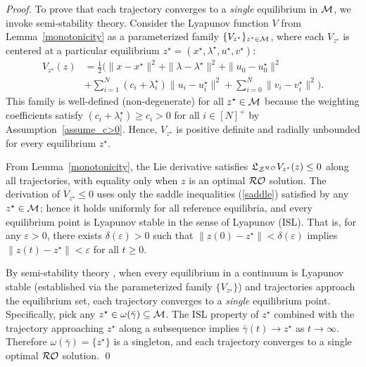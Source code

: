 \documentclass[journal,twoside,web]{ieeecolor}
\newcommand{\rev}[1]{#1}
\begin{document}
\begin{proof}
\rev{To prove that each trajectory converges to a \textit{single} equilibrium in ${\cal M}$, we invoke semi-stability theory. Consider the Lyapunov function $V$ from Lemma~\ref{monotonicity} as a parameterized family $\{V_{z^\star}\}_{z^\star \in {\cal M}}$, where each $V_{z^\star}$ is centered at a particular equilibrium $z^\star = (x^\star, \lambda^\star, u^\star, v^\star)$:
\begin{align*}
V_{z^\star}(z) &= \frac{1}{2}\big( \|x-x^\star\|^2 + \|\lambda-\lambda^\star\|^2 + \|u_0-u_0^\star\|^2 \nonumber\\&+ \sum_{i=1}^N(c_i+\lambda_i^\star) \|u_i-u_i^\star\|^2+ \sum_{i=0}^N\|v_i-v_i^\star\|^2 \big).
\end{align*}
This family is well-defined (non-degenerate) for all $z^\star \in {\cal M}$ because the weighting coefficients satisfy $(c_i + \lambda_i^\star) \geq c_i > 0$ for all $i \in [N]^+$ by Assumption~\ref{assume_c>0}. Hence, $V_{z^\star}$ is positive definite and radially unbounded for every equilibrium $z^\star$.}

\rev{From Lemma~\ref{monotonicity}, the Lie derivative satisfies $\mathfrak{L}_{{\cal Z}^{\cal RO}} V_{z^\star}(z) \leq 0$ along all trajectories, with equality only when $z$ is an optimal ${\cal RO}$ solution. The derivation of $\dot V_{z^\star} \leq 0$ uses only the saddle inequalities (\ref{saddle}) satisfied by any $z^\star \in {\cal M}$; hence it holds uniformly for all reference equilibria, and every equilibrium point is Lyapunov stable in the sense of Lyapunov (ISL). That is, for any $\varepsilon > 0$, there exists $\delta(\varepsilon) > 0$ such that $\|z(0) - z^\star\| < \delta(\varepsilon)$ implies $\|z(t) - z^\star\| < \varepsilon$ for all $t \geq 0$.}

\rev{By semi-stability theory \cite[Theorem~3.1]{haddad2009semistability}, when every equilibrium in a continuum is Lyapunov stable (established via the parameterized family $\{V_{z^\star}\}$) and trajectories approach the equilibrium set, each trajectory converges to a \textit{single} equilibrium point. Specifically, pick any $z^\star \in \omega(\bar{\gamma}) \subseteq {\cal M}$. The ISL property of $z^\star$ combined with the trajectory approaching $z^\star$ along a subsequence implies $\bar{\gamma}(t) \to z^\star$ as $t \to \infty$. Therefore $\omega(\bar{\gamma}) = \{z^\star\}$ is a singleton, and each trajectory converges to a single optimal ${\cal RO}$ solution.}
\qed
\end{proof}
\end{document}
